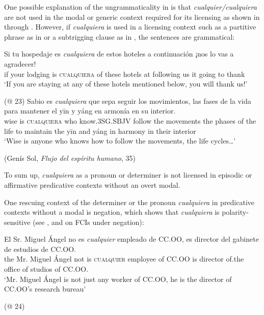 One possible explanation of the ungrammaticality in  is that \textit{cualquier{\slash}cual\-quiera} are not used in the modal or generic context required for its licensing as shown in  through . However, if \textit{cualquiera} is used in a licensing context such as a partitive phrase as in  or a subtrigging clause as in , the sentences are grammatical:

\ea %
\ea \label{bkm:Ref57364726} \gll Si tu hospedaje es \textit{cualquiera} de estos hoteles a continuación ¡nos lo vas a agradecer!\\
if your lodging is \textsc{cualquiera} of these hotels at following us it going to thank\\ 
    \glt ‘If you are staying at any of these hotels mentioned below, you will thank us!’

    (@ 23)
\ex \label{bkm:Ref57364726-b} \gll Sabio es \textit{cualquiera} que sepa seguir los movimientos, las fases de la vida para mantener el yīn y yáng en armonía en su interior.\\
wise is \textsc{cualquiera} who know.\textsc{3SG.SBJV} follow the movements the phases of the life to maintain the yīn and yáng in harmony in their interior\\
    \glt ‘Wise is anyone who knows how to follow the movements, the life cycles…’

    (Genís Sol, \textit{Flujo del espíritu humano}, 35)
\z
\z

To sum up, \textit{cualquiera} as a pronoun or determiner is not licensed in episodic or affirmative predicative contexts without an overt modal.

One rescuing context of the determiner or the pronoun \textit{cualquiera} in predicative contexts without a modal is negation, which shows that \textit{cualquiera} is polarity-sensitive (see \citealt{Chierchia2006},  and  on FCIs under negation):

\ea %
\label{ex:key:37}
 \gll El Sr. Miguel Ángel no es \textit{cualquier} empleado de CC.OO, es director del gabinete de estudios de CC.OO.\\
the Mr. Miguel Ángel not is \textsc{cualquier} employee of CC.OO is director of.the office of studios of CC.OO.\\
  \glt ‘Mr. Miguel Ángel is not just any worker of CC.OO, he is the director of CC.OO’s research bureau’

  (@ 24)
\z

